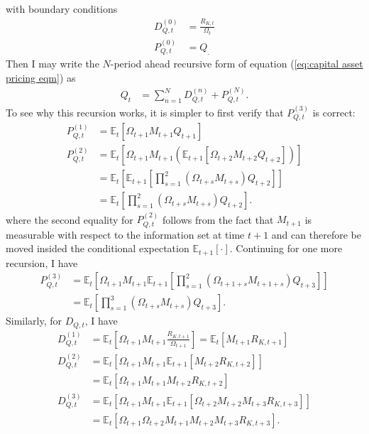 \documentclass[12 pt, oneside]{article}
\theoremstyle{definition}
\theoremstyle{definition}
\theoremstyle{definition}
\newcommand{\E}{\mathbb{E}}
\begin{document}
with boundary conditions
\begin{align*}
  D_{Q, t}^{(0)} & = \frac{R_{K, t}}{\Omega_t}\\
  P_{Q, t}^{(0)} & = Q_.
\end{align*}
Then I may write the $N$-period ahead recursive form of equation (\ref{eq:capital asset pricing eqm}) as
\begin{align*}
  Q_t & = \sum_{n = 1}^ND_{Q, t}^{(n)} + P_{Q, t}^{(N)}.
\end{align*}
To see why this recursion works, it is simpler to first verify that $P_{Q, t}^{(3)}$ is correct:
\begin{align*}
  P_{Q, t}^{(1)} & = \E_t\left[\Omega_{t + 1}M_{t + 1} Q_{t + 1}\right]\\
  P_{Q, t}^{(2)} & = \E_t\left[\Omega_{t + 1}M_{t + 1} (\E_{t + 1}[\Omega_{t + 2}M_{t + 2} Q_{t + 2}])\right]\\
                 & = \E_t\left[\E_{t + 1}\left[\prod_{s = 1}^2(\Omega_{t + s}M_{t + s}) Q_{t + 2}\right]\right]\\
                 & = \E_t\left[\prod_{s = 1}^2(\Omega_{t + s}M_{t + s}) Q_{t + 2}\right].
\end{align*}
where the second equality for $P_{Q, t}^{(2)}$ follows from the fact that $M_{t + 1}$ is measurable with respect to the information set at time $t + 1$ and can
therefore be moved insided the conditional expectation $\E_{t + 1}[\cdot]$. Continuing for one more recursion, I have
\begin{align*}
  P_{Q, t}^{(3)} & = \E_t\left[\Omega_{t + 1}M_{t + 1}\E_{t + 1}\left[\prod_{s = 1}^2(\Omega_{t + 1 + s}M_{t + 1 + s}) Q_{t + 3}\right]\right]\\
                 & = \E_t\left[\prod_{s = 1}^3(\Omega_{t + s}M_{t + s}) Q_{t + 3}\right].
\end{align*}
Similarly, for $D_{Q, t}$, I have
\begin{align*}
  D_{Q, t}^{(1)} & = \E_t\left[\Omega_{t + 1}M_{t + 1}\frac{R_{K, t + 1}}{\Omega_{t + 1}}\right] = \E_t[M_{t + 1} R_{K, t + 1}]\\
  D_{Q, t}^{(2)} & = \E_t[\Omega_{t + 1}M_{t + 1}\E_{t + 1}[M_{t + 2}R_{K, t + 2}]]\\
                 & = \E_t[\Omega_{t + 1}M_{t + 1}M_{t + 2}R_{K, t + 2}]\\
  D_{Q, t}^{(3)} & = \E_t[\Omega_{t + 1}M_{t + 1}\E_{t + 1}[\Omega_{t + 2}M_{t + 2}M_{t + 3}R_{K, t + 3}]]\\
                 & = \E_t[\Omega_{t + 1}\Omega_{t + 2}M_{t + 1}M_{t + 2}M_{t + 3}R_{K, t + 3}].
\end{align*}
\end{document}
